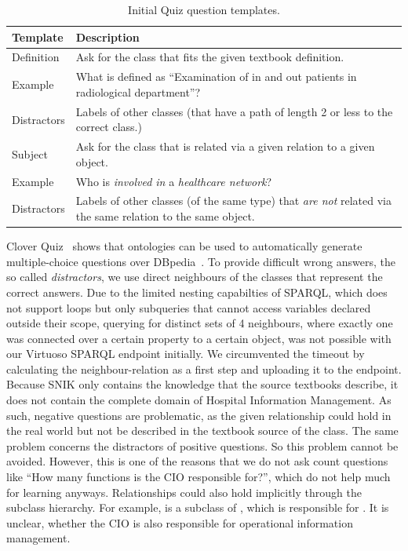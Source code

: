 \documentclass{IOS-Book-Article}     %
\newcommand{\citep}{\cite}%
\begin{document}
\begin{table}[t]
\caption{Initial Quiz question templates.}
\label{tab:templates}
\centering
\begin{tabulary}{\columnwidth}{lL}
\toprule
\textbf{Template}	&\textbf{Description}\\
\midrule
Definition		&Ask for the class that fits the given textbook definition.\\
Example			&What is defined as \enquote{Examination of in and out patients in radiological department}?\\
Distractors		&Labels of other classes (that have a path of length 2 or less to the correct class.)\\
\midrule
Subject			&Ask for the class that is related via a given relation to a given object.\\
Example			&Who is \emph{involved in} a \emph{healthcare network}?\\
Distractors		&Labels of other classes (of the same type) that \emph{are not} related via the same relation to the same object.\\
\bottomrule
\end{tabulary}
\end{table}

Clover Quiz~\citep{cloverquiz} shows that ontologies can be used to automatically generate multiple-choice questions over DBpedia~\citep{dbpedia}.
To provide difficult wrong answers, the so called \emph{distractors}, we use direct neighbours of the classes that represent the correct answers.
Due to the limited nesting capabilties of SPARQL, which does not support loops but only subqueries that cannot access variables declared outside their scope, querying for distinct sets of 4 neighbours, where exactly one was connected over a certain property to a certain object, was not possible with our Virtuoso SPARQL endpoint initially.
We circumvented the timeout by calculating the neighbour-relation as a first step and uploading it to the endpoint.
%
Because SNIK only contains the knowledge that the source textbooks describe, it does not contain the complete domain of Hospital Information Management.
As such, negative questions are problematic, as the given relationship could hold in the real world but not be described in the textbook source of the class.
The same problem concerns the distractors of positive questions.
So this problem cannot be avoided.
However, this is one of the reasons that we do not ask count questions like \enquote{How many functions is the CIO responsible for?}, which do not help much for learning anyways. %
Relationships could also hold implicitly through the subclass hierarchy.
For example,  is a subclass of , which is responsible for .
It is unclear, whether the CIO is also responsible for operational information management.
\end{document}
